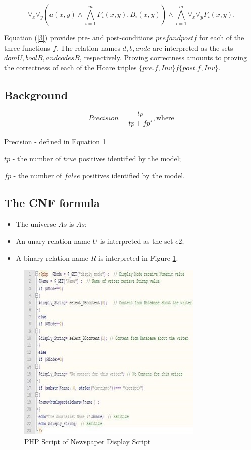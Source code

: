 \documentclass[12pt]{acmart}
\begin{document}
\begin{equation}
    \forall_x \forall_y (a(x,y) \wedge \bigwedge_{i=1}^mF_i(x,y), B_i(x,y)) \wedge \bigwedge_{i=1}^m \forall_x \forall_y F_i(x,y).
    \label{2}
\end{equation}
 
 Equation (\ref{3}) provides pre- and post-conditions $pref and postf$ for each of the three functions $f$. The relation names $d, b, and c$ are interpreted as the sets $domU   , boolB, and codesB$, respectively. Proving correctness amounts to proving the correctness of each of the Hoare triples $\{pre.f, Inv\}  f  \{post.f, Inv\}$.

\subsection{Background}

\begin{equation}
    Precision = \frac{tp}{tp + fp'},
    \text{where}
    \label{3}
\end{equation}\\

Precision - defined in Equation 1\par
    $tp$ - the number of $true$ positives identified by the model;\par
	$fp$ - the number of $false$ positives identified by the model.

\subsection{The CNF formula}

\begin{itemize}
    \item The universe $As$ is $As$;
    \item An unary relation name $U$ is interpreted as the set $e2$;
    \item A binary relation name $R$ is interpreted in Figure \ref{pic2}.
\end{itemize}

\begin{figure}[H]
    \centering
    \includegraphics{Picture2.jpg}
    \caption{PHP Script of Newspaper Display Script}
    \label{pic2}
\end{figure}
\end{document}
